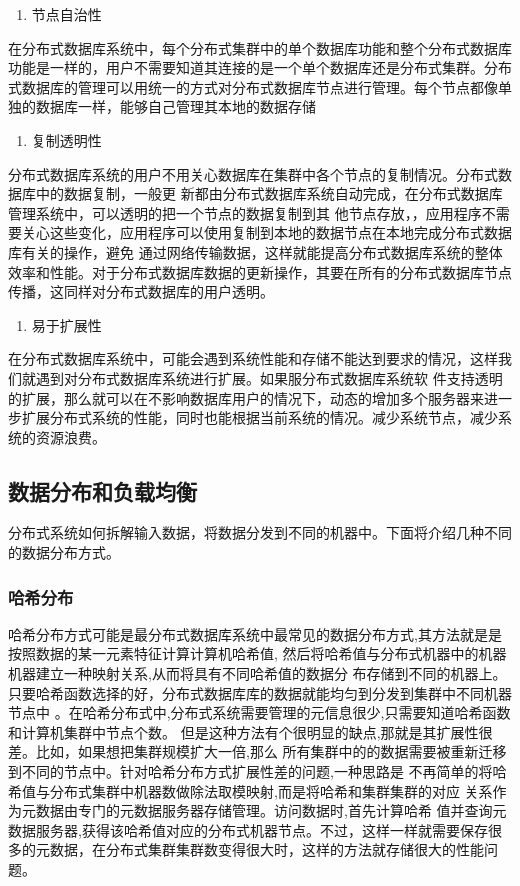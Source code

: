 	\begin{enumerate}[resume]
		\item 节点自治性
	\end{enumerate}

	在分布式数据库系统中，每个分布式集群中的单个数据库功能和整个分布式数据库功能是一样的，用户不需要知道其连接的是一个单个数据库还是分布式集群。分布式数据库的管理可以用统一的方式对分布式数据库节点进行管理。每个节点都像单独的数据库一样，能够自己管理其本地的数据存储

	\begin{enumerate}[resume]
		\item 复制透明性
	\end{enumerate}

	分布式数据库系统的用户不用关心数据库在集群中各个节点的复制情况。分布式数据库中的数据复制，一般更
	新都由分布式数据库系统自动完成，在分布式数据库管理系统中，可以透明的把一个节点的数据复制到其
	他节点存放，，应用程序不需要关心这些变化，应用程序可以使用复制到本地的数据节点在本地完成分布式数据库有关的操作，避免
	通过网络传输数据，这样就能提高分布式数据库系统的整体效率和性能。对于分布式数据库数据的更新操作，其要在所有的分布式数据库节点传播，这同样对分布式数据库的用户透明。

	\begin{enumerate}[resume]
		\item 易于扩展性
	\end{enumerate}

	在分布式数据库系统中，可能会遇到系统性能和存储不能达到要求的情况，这样我们就遇到对分布式数据库系统进行扩展。如果服分布式数据库系统软
	件支持透明的扩展，那么就可以在不影响数据库用户的情况下，动态的增加多个服务器来进一步扩展分布式系统的性能，同时也能根据当前系统的情况。减少系统节点，减少系统的资源浪费。
\subsection{数据分布和负载均衡}
分布式系统如何拆解输入数据，将数据分发到不同的机器中。下面将介绍几种不同的数据分布方式。 
\subsubsection{哈希分布}
哈希分布方式可能是最分布式数据库系统中最常见的数据分布方式,其方法就是是按照数据的某一元素特征计算计算机哈希值,
然后将哈希值与分布式机器中的机器机器建立一种映射关系,从而将具有不同哈希值的数据分
布存储到不同的机器上。
只要哈希函数选择的好，分布式数据库库的数据就能均匀到分发到集群中不同机器节点中
。在哈希分布式中,分布式系统需要管理的元信息很少,只需要知道哈希函数和计算机集群中节点个数。 
但是这种方法有个很明显的缺点,那就是其扩展性很差。比如，如果想把集群规模扩大一倍,那么
所有集群中的的数据需要被重新迁移到不同的节点中。针对哈希分布方式扩展性差的问题,一种思路是
不再简单的将哈希值与分布式集群中机器数做除法取模映射,而是将哈希和集群集群的对应
关系作为元数据由专门的元数据服务器存储管理。访问数据时,首先计算哈希
值并查询元数据服务器,获得该哈希值对应的分布式机器节点。不过，这样一样就需要保存很多的元数据，在分布式集群集群数变得很大时，这样的方法就存储很大的性能问题。
